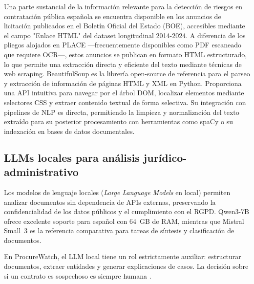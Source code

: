 \documentclass[11pt,a4paper,spanish]{book}
\numberwithin{equation}{chapter}
\numberwithin{figure}{chapter}
\begin{document}
Una parte sustancial de la informaci{\'o}n relevante para la detecci{\'o}n de riesgos en contratación p{\'u}blica española se encuentra disponible en los anuncios de licitaci{\'o}n publicados en el Bolet{\'i}n Oficial del Estado (BOE), accesibles mediante el campo "Enlace HTML" del dataset longitudinal 2014-2024. A diferencia de los pliegos alojados en PLACE —frecuentemente disponibles como PDF escaneado que requiere OCR—, estos anuncios se publican en formato HTML estructurado, lo que permite una extracci{\'o}n directa y eficiente del texto mediante t{\'e}cnicas de web scraping. BeautifulSoup \cite{Richardson2024BeautifulSoup} es la librer{\'i}a open-source de referencia para el parseo y extracci{\'o}n de informaci{\'o}n de p{\'a}ginas HTML y XML en Python. Proporciona una API intuitiva para navegar por el {\'a}rbol DOM, localizar elementos mediante selectores CSS y extraer contenido textual de forma selectiva. Su integraci{\'o}n con pipelines de NLP es directa, permitiendo la limpieza y normalizaci{\'o}n del texto extraído para su posterior procesamiento con herramientas como spaCy o su indexaci{\'o}n en bases de datos documentales.

\subsection{LLMs locales para an{\'a}lisis jur{\'i}dico-administrativo}

Los modelos de lenguaje locales (\textit{Large Language Models} en local) permiten analizar documentos sin dependencia de APIs externas, preservando la confidencialidad de los datos p{\'u}blicos y el cumplimiento con el RGPD. Qwen3-7B \cite{AlibabaQwen3} ofrece excelente soporte para espa{\~n}ol con 64~GB de RAM, mientras que Mistral Small~3 \cite{MistralSmall3} es la referencia comparativa para tareas de s{\'i}ntesis y clasificaci{\'o}n de documentos.

En ProcureWatch, el LLM local tiene un rol estrictamente auxiliar: estructurar documentos, extraer entidades y generar explicaciones de casos. La decisi{\'o}n sobre si un contrato es sospechoso es siempre humana \cite{AIAct2024}.


\end{document}
